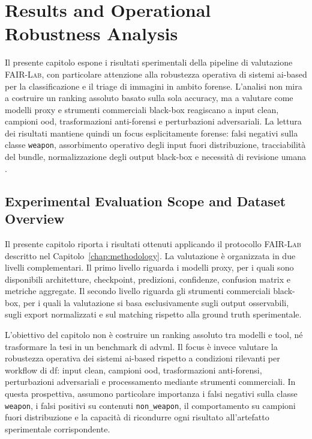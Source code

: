 \chapter{Results and Operational Robustness Analysis}
\label{chap:results}

Il presente capitolo espone i risultati sperimentali della pipeline di valutazione
\textsc{FAIR-Lab}, con particolare attenzione alla robustezza operativa di sistemi
\gls{ai}-based per la classificazione e il triage di immagini in ambito forense.
L'analisi non mira a costruire un ranking assoluto basato sulla sola accuracy,
ma a valutare come modelli proxy e strumenti commerciali black-box reagiscano a
input clean, campioni \gls{ood}, trasformazioni anti-forensi e perturbazioni
adversariali. La lettura dei risultati mantiene quindi un focus esplicitamente
forense: falsi negativi sulla classe \texttt{weapon}, assorbimento operativo degli
input fuori distribuzione, tracciabilità del bundle, normalizzazione degli output
black-box e necessità di revisione umana \cite{costantini2019digital,sanna2024preliminary,sanna2025pixelperfect}.


\section{Experimental Evaluation Scope and Dataset Overview}
\label{sec:results-scope}

Il presente capitolo riporta i risultati ottenuti applicando il protocollo
\textsc{FAIR-Lab} descritto nel Capitolo~\ref{chap:methodology}. La valutazione
è organizzata in due livelli complementari. Il primo livello riguarda i modelli
proxy, per i quali sono disponibili architetture, checkpoint, predizioni,
confidenze, confusion matrix e metriche aggregate. Il secondo livello riguarda
gli strumenti commerciali black-box, per i quali la valutazione si basa
esclusivamente sugli output osservabili, sugli export normalizzati e sul matching
rispetto alla ground truth sperimentale.

L'obiettivo del capitolo non è costruire un ranking assoluto tra modelli e tool,
né trasformare la tesi in un benchmark di \gls{advml}. Il focus è invece
valutare la robustezza operativa dei sistemi \gls{ai}-based rispetto a condizioni
rilevanti per workflow di \gls{df}: input clean, campioni \gls{ood},
trasformazioni anti-forensi, perturbazioni adversariali e processamento mediante
strumenti commerciali. In questa prospettiva, assumono particolare importanza i
falsi negativi sulla classe \texttt{weapon}, i falsi positivi su contenuti
\texttt{non\_weapon}, il comportamento su campioni fuori distribuzione e la
capacità di ricondurre ogni risultato all'artefatto sperimentale corrispondente.


